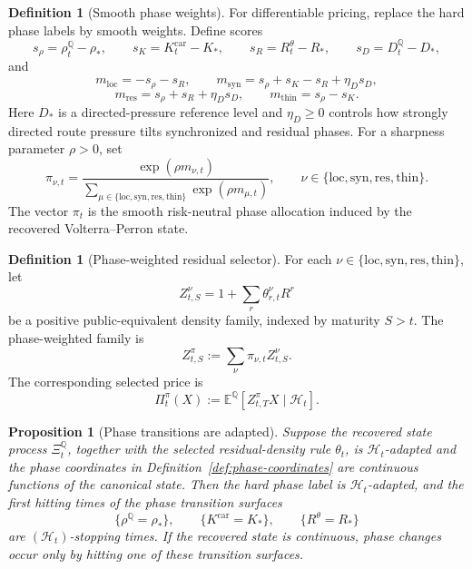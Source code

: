 \documentclass[11pt,a4paper]{amsart}
\theoremstyle{plain}
\newtheorem{proposition}[theorem]{Proposition}
\theoremstyle{definition}
\newtheorem{definition}[theorem]{Definition}
\theoremstyle{remark}
\newcommand{\QQ}{\mathbb{Q}}
\newcommand{\EE}{\mathbb{E}}
\newcommand{\cH}{\mathcal{H}}
\begin{document}
\begin{definition}[Smooth phase weights]\label{def:smooth-phase-weights}
For differentiable pricing, replace the hard phase labels by smooth weights.  Define scores
\[
        s_\rho=\rho_t^\QQ-\rho_*,
        \qquad
        s_K=K_t^{\mathrm{car}}-K_*,
        \qquad
        s_R=R_t^\theta-R_*,
        \qquad
        s_D=D_t^\QQ-D_*,
\]
and
\[
        m_{\mathrm{loc}}=-s_\rho-s_R,\qquad
        m_{\mathrm{syn}}=s_\rho+s_K-s_R+\eta_D s_D,
\]
\[
        m_{\mathrm{res}}=s_\rho+s_R+\eta_D s_D,\qquad
        m_{\mathrm{thin}}=s_\rho-s_K .
\]
Here \(D_*\) is a directed-pressure reference level and \(\eta_D\ge0\) controls how strongly
directed route pressure tilts synchronized and residual phases.  For a sharpness parameter
\(\rho>0\), set
\[
        \pi_{\nu,t}
        =
        \frac{\exp(\rho m_{\nu,t})}
        {\sum_{\mu\in\{\mathrm{loc},\mathrm{syn},\mathrm{res},\mathrm{thin}\}}
        \exp(\rho m_{\mu,t})},
        \qquad
        \nu\in\{\mathrm{loc},\mathrm{syn},\mathrm{res},\mathrm{thin}\}.
\]
The vector \(\pi_t\) is the smooth risk-neutral phase allocation induced by the recovered
Volterra--Perron state.
\end{definition}

\begin{definition}[Phase-weighted residual selector]\label{def:phase-weighted-selector}
For each \(\nu\in\{\mathrm{loc},\mathrm{syn},\mathrm{res},\mathrm{thin}\}\), let
\[
        Z_{t,S}^{\nu}
        =
        1+\sum_r\theta_{r,t}^{\nu}R^r
\]
be a positive public-equivalent density family, indexed by maturity \(S>t\).  The
phase-weighted family is
\[
        Z_{t,S}^{\pi}
        :=
        \sum_{\nu}
        \pi_{\nu,t}Z_{t,S}^{\nu}.
\]
The corresponding selected price is
\[
        \Pi_t^\pi(X):=\EE^\QQ[Z_{t,T}^{\pi}X\mid\cH_t].
\]
\end{definition}

\begin{proposition}[Phase transitions are adapted]\label{prop:phase-transitions-adapted}
Suppose the recovered state process \(\Xi_t^\QQ\), together with the selected
residual-density rule \(\theta_t\), is \(\cH_t\)-adapted and the phase
coordinates in Definition~\ref{def:phase-coordinates} are continuous functions of the canonical
state.  Then the hard phase label is \(\cH_t\)-adapted, and the first hitting times of the phase
transition surfaces
\[
        \{\rho^\QQ=\rho_*\},\qquad
        \{K^{\mathrm{car}}=K_*\},\qquad
        \{R^\theta=R_*\}
\]
are \((\cH_t)\)-stopping times.  If the recovered state is continuous, phase changes occur only
by hitting one of these transition surfaces.
\end{proposition}
\end{document}
